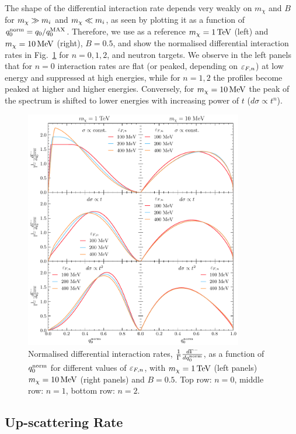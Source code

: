 The shape of the differential interaction rate depends very weakly on $m_\chi$ and $B$ for $m_\chi\gg m_i$ and $m_\chi \ll m_i$, as seen by plotting it as a function of $q_0^{\rm norm}=q_0/q_0^{\rm MAX}$. Therefore, we use as a reference $m_\chi=1{\rm \,TeV}$ (left) and $m_\chi=10{\rm \,MeV}$ (right),  $B=0.5$, and show the normalised differential interaction rates in Fig.~\ref{app:fig:diffgamma} for $n=0,1,2$, and neutron targets.
We observe in the left panels that for $n=0$ interaction rates are flat (or peaked, depending on $\varepsilon_{F,n}$) at low energy and suppressed at high energies, while for $n=1,2$ the profiles become peaked at higher and higher energies. Conversely, for $m_\chi=10{\rm \,MeV}$ the peak of the spectrum is shifted to lower energies with increasing power of $t$ ($d\sigma\propto t^n$).

\begin{figure}
    \centering
    \includegraphics[width = 0.85\textwidth]{img/capture_intro/capture_1/norm_diff_intrate_n.pdf}
    \caption{Normalised differential interaction rates, $\frac{1}{\Gamma}\frac{d\Gamma^-}{dq_0^{\rm norm}}$, as a function of $q_0^{\rm norm}$ for different values of $\varepsilon_{F,n}$, with $m_\chi=1{\rm \,TeV}$ (left panels) $m_\chi=10{\rm \,MeV}$ (right panels) and $B=0.5$. Top row: $n=0$, middle row: $n=1$, bottom row: $n=2$.}
    \label{app:fig:diffgamma}
\end{figure}

\subsection{Up-scattering Rate}
\label{app:subsec:up_scatter_derivation}

